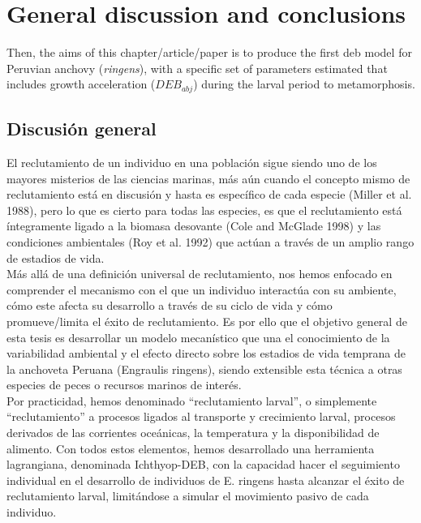 \chapter{General discussion and conclusions}\label{Chap5}

Then, the aims of this chapter/article/paper is to produce the first \acrshort{deb} model for Peruvian anchovy (\textit{\gls{ringens}}),  with a specific set of parameters estimated  that includes growth acceleration ($DEB_{abj}$)  during the larval period to metamorphosis.%

\clearpage
\section{Discusión general}
El reclutamiento de un individuo en una población sigue siendo uno de los mayores misterios de las ciencias marinas, más aún cuando el concepto mismo de reclutamiento está en discusión y hasta es específico de cada especie (Miller et al. 1988), pero lo que es cierto para todas las especies, es que el reclutamiento está íntegramente ligado a la biomasa desovante (Cole and McGlade 1998) y las condiciones ambientales (Roy et al. 1992) que actúan a través de un amplio rango de estadios de vida.\\

Más allá de una definición universal de reclutamiento, nos hemos enfocado en comprender el mecanismo con el que un individuo interactúa con su ambiente, cómo este afecta su desarrollo a través de su ciclo de vida y cómo promueve/limita el éxito de reclutamiento. Es por ello que el objetivo general de esta tesis es desarrollar un modelo mecanístico que una el conocimiento de la variabilidad ambiental y el efecto directo sobre los estadios de vida temprana de la anchoveta Peruana (Engraulis ringens), siendo extensible esta técnica a otras especies de peces o recursos marinos de interés.\\

Por practicidad, hemos denominado “reclutamiento larval”, o simplemente “reclutamiento” a procesos ligados al transporte y crecimiento larval, procesos derivados de las corrientes oceánicas, la temperatura y la disponibilidad de alimento. Con todos estos elementos, hemos desarrollado una herramienta lagrangiana, denominada Ichthyop-DEB, con la capacidad hacer el seguimiento individual en el desarrollo de individuos de E. ringens hasta alcanzar el éxito de reclutamiento larval, limitándose a simular el movimiento pasivo de cada individuo.\\

